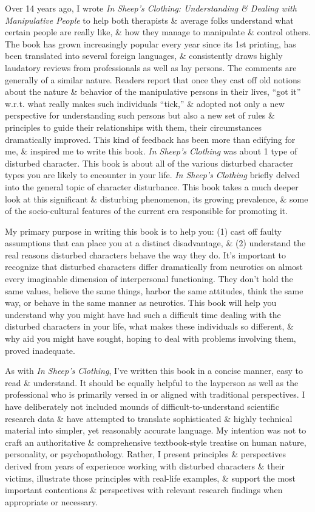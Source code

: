 \documentclass{article}
\numberwithin{equation}{section}
\begin{document}
Over 14 years ago, I wrote \textit{In Sheep's Clothing: Understanding \& Dealing with Manipulative People} to help both therapists \& average folks understand what certain people are really like, \& how they manage to manipulate \& control others. The book has grown increasingly popular every year since its 1st printing, has been translated into several foreign languages, \& consistently draws highly laudatory reviews from professionals as well as lay persons. The comments are generally of a similar nature. Readers report that once they cast off old notions about the nature \& behavior of the manipulative persons in their lives, ``got it'' w.r.t. what really makes such individuals ``tick,'' \& adopted not only a new perspective for understanding such persons but also a new set of rules \& principles to guide their relationships with them, their circumstances dramatically improved. This kind of feedback has been more than edifying for me, \& inspired me to write this book. \textit{In Sheep's Clothing} was about 1 type of disturbed character. This book is about all of the various disturbed character types you are likely to encounter in your life. \textit{In Sheep's Clothing} briefly delved into the general topic of character disturbance. This book takes a much deeper look at this significant \& disturbing phenomenon, its growing prevalence, \& some of the socio-cultural features of the current era responsible for promoting it.

My primary purpose in writing this book is to help you: (1) cast off faulty assumptions that can place you at a distinct disadvantage, \& (2) understand the real reasons disturbed characters behave the way they do. It's important to recognize that disturbed characters differ dramatically from neurotics on almost every imaginable dimension of interpersonal functioning. They don't hold the same values, believe the same things, harbor the same attitudes, think the same way, or behave in the same manner as neurotics. This book will help you understand why you might have had such a difficult time dealing with the disturbed characters in your life, what makes these individuals so different, \& why aid you might have sought, hoping to deal with problems involving them, proved inadequate.

As with \textit{In Sheep's Clothing}, I've written this book in a concise manner, easy to read \& understand. It should be equally helpful to the layperson as well as the professional who is primarily versed in or aligned with traditional perspectives. I have deliberately not included mounds of difficult-to-understand scientific research data \& have attempted to translate sophisticated \& highly technical material into simpler, yet reasonably accurate language. My intention was not to craft an authoritative \& comprehensive textbook-style treatise on human nature, personality, or psychopathology. Rather, I present principles \& perspectives derived from years of experience working with disturbed characters \& their victims, illustrate those principles with real-life examples, \& support the most important contentions \& perspectives with relevant research findings when appropriate or necessary.
\end{document}
